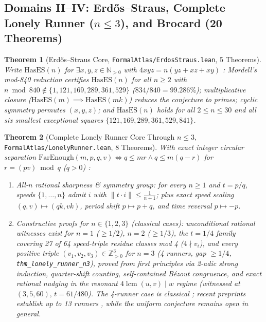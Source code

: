 \documentclass[11pt,reqno]{amsart}
\theoremstyle{plain}
\newtheorem{theorem}{Theorem}[section]
\theoremstyle{definition}
\newcommand{\Z}{\mathbb{Z}}
\newcommand{\N}{\mathbb{N}}
\newcommand{\code}[1]{{\upshape\nolinkurl{#1}}}
\begin{document}
\subsection{Domains II--IV: Erd\H{o}s--Straus, Complete Lonely Runner (\texorpdfstring{$n \le 3$}{n <= 3}), and Brocard (20 Theorems)}

\begin{theorem}[Erd\H{o}s--Straus Core, \code{FormalAtlas/ErdosStraus.lean}, 5 Theorems]
Write $\mathrm{HasES}(n)$ for $\exists x,y,z \in \N_{>0}$ with $4xyz = n(yz + xz + xy)$
\cite{mordell1969,elsholtztao2013}: Mordell's mod-840 reduction certifies $\mathrm{HasES}(n)$ for
all $n \ge 2$ with $n \bmod 840 \notin \{1,121,169,289,361,529\}$ ($834/840 = 99.286\%$);
multiplicative closure ($\mathrm{HasES}(m) \implies \mathrm{HasES}(mk)$) reduces the conjecture
to primes; cyclic symmetry permutes $(x,y,z)$; and $\mathrm{HasES}(n)$ holds for all
$2 \le n \le 30$ and all six smallest exceptional squares $\{121, 169, 289, 361, 529, 841\}$.
\end{theorem}

\begin{theorem}[Complete Lonely Runner Core Through $n \le 3$, \code{FormalAtlas/LonelyRunner.lean}, 8 Theorems]
With exact integer circular separation $\mathrm{FarEnough}(m,p,q,v) \iff q \le mr \land q \le m(q-r)$
for $r = (pv) \bmod q$ ($q > 0$) \cite{wills1967,betkewills1972,cusick1973,tao2018lonely}:
\begin{enumerate}
  \item \emph{All-$n$ rational sharpness \& symmetry group:} for every $n \ge 1$ and $t = p/q$,
    speeds $\{1,\dots,n\}$ admit $i$ with $\|t \cdot i\| \le \frac{1}{n+1}$; plus exact speed
    scaling $(q,v) \mapsto (qk,vk)$, period shift $p \mapsto p+q$, and time reversal $p \mapsto -p$.
  \item \emph{Constructive proofs for $n \in \{1, 2, 3\}$ (classical cases):}
    unconditional rational witnesses exist for $n=1$ ($\ge 1/2$), $n=2$ ($\ge 1/3$), the $t=1/4$
    family covering 27 of 64 speed-triple residue classes mod 4 ($4 \nmid v_i$), and every
    positive triple $(v_1, v_2, v_3) \in \Z_{>0}^3$ for $n = 3$ (4 runners, gap $\ge 1/4$,
    \code{thm_lonely_runner_n3}), proved from first principles via 2-adic strong induction,
    quarter-shift counting, self-contained B\'ezout congruence, and exact rational nudging in
    the resonant $4\operatorname{lcm}(u,v) \mid w$ regime (witnessed at $(3,5,60),\, t=61/480$).
    The 4-runner case is classical \cite{betkewills1972,cusick1973}; recent preprints establish
    up to 13 runners \cite{rosenfeld2025lonely8,trakulthongchai2025lonely910,sungkawichai2026lonely1113},
    while the uniform conjecture remains open in general.
\end{enumerate}
\end{theorem}
\end{document}
